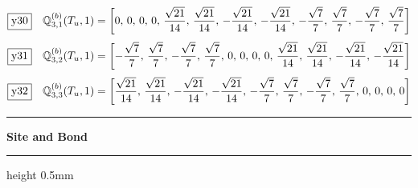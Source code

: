 \documentclass[fleqn,10pt,landscape]{jsarticle}
\begin{document}
\begin{dmath*}
\fbox{y30}\quad \mathbb{Q}_{3,1}^{(b)}(T_{u},1)=\left[ 0,\, 0,\, 0,\, 0,\, \frac{\sqrt{21}}{14},\, \frac{\sqrt{21}}{14},\, - \frac{\sqrt{21}}{14},\, - \frac{\sqrt{21}}{14},\, - \frac{\sqrt{7}}{7},\, \frac{\sqrt{7}}{7},\, - \frac{\sqrt{7}}{7},\, \frac{\sqrt{7}}{7} \right]
\end{dmath*}
\begin{dmath*}
\fbox{y31}\quad \mathbb{Q}_{3,2}^{(b)}(T_{u},1)=\left[ - \frac{\sqrt{7}}{7},\, \frac{\sqrt{7}}{7},\, - \frac{\sqrt{7}}{7},\, \frac{\sqrt{7}}{7},\, 0,\, 0,\, 0,\, 0,\, \frac{\sqrt{21}}{14},\, \frac{\sqrt{21}}{14},\, - \frac{\sqrt{21}}{14},\, - \frac{\sqrt{21}}{14} \right]
\end{dmath*}
\begin{dmath*}
\fbox{y32}\quad \mathbb{Q}_{3,3}^{(b)}(T_{u},1)=\left[ \frac{\sqrt{21}}{14},\, \frac{\sqrt{21}}{14},\, - \frac{\sqrt{21}}{14},\, - \frac{\sqrt{21}}{14},\, - \frac{\sqrt{7}}{7},\, \frac{\sqrt{7}}{7},\, - \frac{\sqrt{7}}{7},\, \frac{\sqrt{7}}{7},\, 0,\, 0,\, 0,\, 0 \right]
\end{dmath*}
\vspace{5mm}
\noindent \rule[0.5mm]{5mm}{0.5mm}\hspace{3mm}\textbf{Site and Bond}\hspace{3mm}\leaders\hrule height 0.5mm\hfill\kern0pt
\vspace{3mm}
\end{document}
